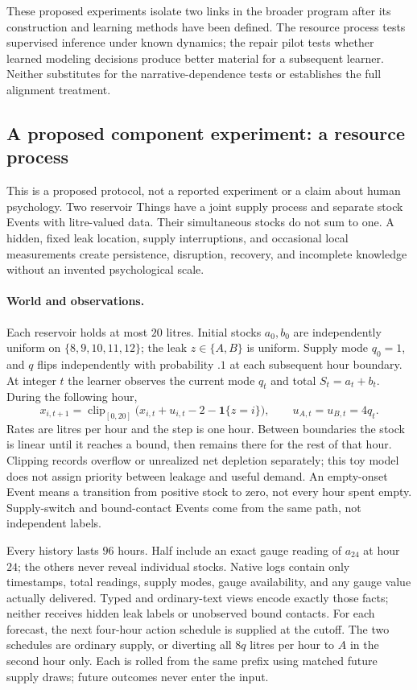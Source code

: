 \documentclass[10pt]{article}
\begin{document}
These proposed experiments isolate two links in the broader program after
its construction and learning methods have been defined. The resource process
tests supervised inference under known dynamics; the repair pilot tests whether
learned modeling decisions produce better material for a subsequent learner.
Neither substitutes for the narrative-dependence tests or establishes the
full alignment treatment.

\subsection{A proposed component experiment: a resource process}
\label{sec:first-experiment}

This is a proposed protocol, not a reported experiment or a claim about human
psychology. Two reservoir Things have a joint supply process and separate
stock Events with litre-valued data. Their simultaneous stocks do not sum to
one. A hidden, fixed leak location, supply interruptions, and occasional local
measurements create persistence, disruption, recovery, and incomplete
knowledge without an invented psychological scale.

\paragraph{World and observations.}
Each reservoir holds at most $20$ litres. Initial stocks $a_0,b_0$ are
independently uniform on $\{8,9,10,11,12\}$; the leak $z\in\{A,B\}$ is uniform.
Supply mode $q_0=1$, and $q$ flips independently with probability $.1$ at each
subsequent hour boundary. At integer $t$ the learner observes the current mode
$q_t$ and total $S_t=a_t+b_t$. During the following hour,
\begin{equation}
 x_{i,t+1}=\operatorname{clip}_{[0,20]}
   \bigl(x_{i,t}+u_{i,t}-2-\mathbf 1\{z=i\}\bigr),
 \qquad u_{A,t}=u_{B,t}=4q_t .
 \label{eq:reservoir}
\end{equation}
Rates are litres per hour and the step is one hour. Between boundaries the
stock is linear until it reaches a bound, then remains there for the rest of
that hour. Clipping records overflow or unrealized net depletion separately;
this toy model does not assign priority between leakage and useful demand.
An empty-onset Event means a transition from positive stock to zero, not
every hour spent empty. Supply-switch and bound-contact Events come from
the same path, not independent labels.

Every history lasts $96$ hours. Half include an exact gauge reading of $a_{24}$
at hour $24$; the others never reveal individual stocks. Native logs contain
only timestamps, total readings, supply modes, gauge availability, and any
gauge value actually delivered. Typed and ordinary-text views encode exactly
those facts; neither receives hidden leak labels or unobserved bound contacts.
For each forecast, the next four-hour action schedule is supplied at the
cutoff. The two schedules are ordinary supply, or diverting all $8q$ litres per
hour to $A$ in the second hour only. Each is rolled from the same prefix using
matched future supply draws; future outcomes never enter the input.
\end{document}

